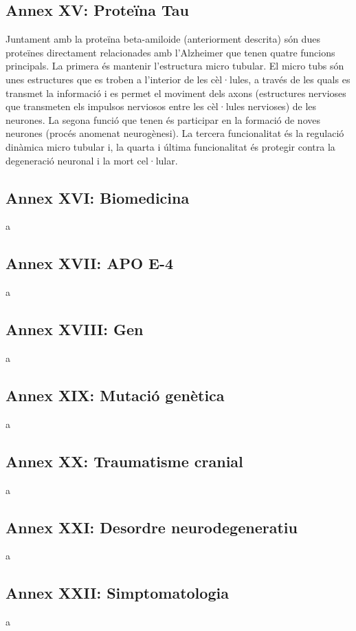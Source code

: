 \documentclass[a4paper,12pt]{article}
\begin{document}
\subsection*{Annex XV: Proteïna Tau}
Juntament amb la proteïna beta-amiloide (anteriorment descrita) són dues proteïnes directament relacionades amb l'Alzheimer que tenen quatre funcions principals. La primera és mantenir l'estructura micro tubular. El micro tubs són unes estructures que es troben a l'interior de les cèl·lules, a través de les quals es transmet la informació i es permet el moviment dels axons (estructures nervioses que transmeten els impulsos nerviosos entre les cèl·lules nervioses) de les neurones. La segona funció que tenen és participar en la formació de noves neurones (procés anomenat neurogènesi). La tercera funcionalitat és la regulació dinàmica micro tubular i, la quarta i última funcionalitat és protegir contra la degeneració neuronal i la mort cel·lular.
\subsection*{Annex XVI: Biomedicina}
a
\subsection*{Annex XVII: APO E-4}
a
\subsection*{Annex XVIII: Gen}
a
\subsection*{Annex XIX: Mutació genètica}
a
\subsection*{Annex XX: Traumatisme cranial}
a
\subsection*{Annex XXI: Desordre neurodegeneratiu}
a
\subsection*{Annex XXII: Simptomatologia}
a
\end{document}
